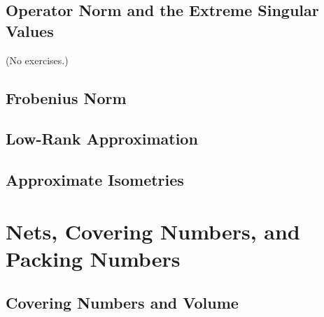 \documentclass{report}
\theoremstyle{definition}
\newenvironment{exercise}[1]{
  \renewcommand\theexerciseimpl{#1}
  \exerciseimpl
}{\endexerciseimpl}
\begin{document}
\subsection{Operator Norm and the Extreme Singular Values}

(No exercises.)

\subsection{Frobenius Norm}

\begin{exercise}{4.1.2}
\end{exercise}

\subsection{Low-Rank Approximation}

\begin{exercise}{4.1.3}
\end{exercise}

\subsection{Approximate Isometries}

\begin{exercise}{4.1.4}
\end{exercise}

\begin{exercise}{4.1.6}
\end{exercise}

\begin{exercise}{4.1.8}
\end{exercise}

\section{Nets, Covering Numbers, and Packing Numbers}

\begin{exercise}{4.2.5}
\end{exercise}

\begin{exercise}{4.2.9}
\end{exercise}

\begin{exercise}{4.2.10}
\end{exercise}

\subsection{Covering Numbers and Volume}
\end{document}
